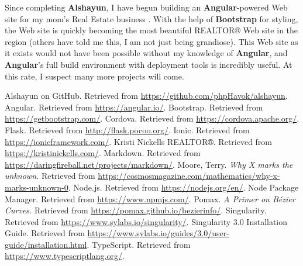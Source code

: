 \documentclass[12pt]{report}
\begin{document}
Since completing \textbf{Alshayun}, I have begun building an
\textbf{Angular}-powered Web site for my mom's Real Estate business \cite{knr}.
With the help of \textbf{Bootstrap} for styling, the Web site is quickly
becoming the most beautiful REALTOR® Web site in the region (others have told me
this, I am not just being grandiose). This Web site as it exists would not have
been possible without my knowledge of \textbf{Angular}, and \textbf{Angular}'s
full build environment with deployment tools is incredibly useful.  At this
rate, I suspect many more projects will come.

\begin{thebibliography}{9}
     Alshayun on GitHub. Retrieved from
        \url{https://github.com/phpHavok/alshayun}.
     Angular. Retrieved from \url{https://angular.io/}.
     Bootstrap. Retrieved from
        \url{https://getbootstrap.com/}.
     Cordova. Retrieved from \url{https://cordova.apache.org/}.
     Flask. Retrieved from \url{http://flask.pocoo.org/}.
     Ionic. Retrieved from \url{https://ionicframework.com/}.
     Kristi Nickells REALTOR®. Retrieved from
        \url{https://kristinickells.com/}.
     Markdown. Retrieved from
        \url{https://daringfireball.net/projects/markdown/}.
     Moore, Terry. \textit{Why X marks the unknown.} Retrieved
        from \url{https://cosmosmagazine.com/mathematics/why-x-marks-unknown-0}.
     Node\@.js. Retrieved from \url{https://nodejs.org/en/}.
     Node Package Manager. Retrieved from \url{https://www.npmjs.com/}.
     Pomax. \textit{A Primer on Bézier Curves.} Retrieved from
        \url{https://pomax.github.io/bezierinfo/}.
     Singularity. Retrieved from \url{https://www.sylabs.io/singularity/}.
     Singularity 3\@.0 Installation Guide. Retrieved
        from
        \url{https://www.sylabs.io/guides/3.0/user-guide/installation.html}.
     TypeScript. Retrieved from
        \url{https://www.typescriptlang.org/}.
\end{thebibliography}
\end{document}
